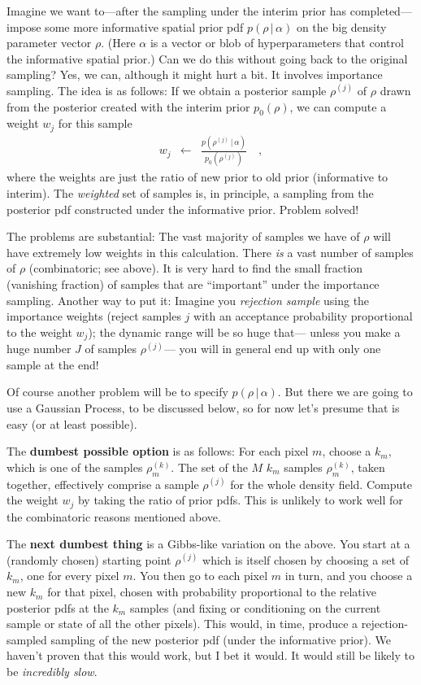 \documentclass[12pt, letterpaper]{article}
\newcommand{\given}{\,|\,}
\begin{document}
Imagine we want to---after the sampling under the interim prior has completed---%
  impose some more informative spatial prior pdf $p(\rho\given\alpha)$
  on the big density parameter vector $\rho$.
(Here $\alpha$ is a vector or blob of hyperparameters that control the informative spatial prior.)
Can we do this without going back to the original sampling?
Yes, we can, although it might hurt a bit.
It involves importance sampling.
The idea is as follows:
If we obtain a posterior sample $\rho^{(j)}$ of $\rho$ drawn from the posterior
  created with the interim prior $p_0(\rho)$,
  we can compute a weight $w_j$ for this sample
\begin{eqnarray}
w_j & \leftarrow & \frac{p(\rho^{(j)}\given\alpha)}{p_0(\rho^{(j)})}
\quad,
\end{eqnarray}
  where the weights are just the ratio of new prior to old prior (informative to interim).
The \emph{weighted} set of samples is, in principle,
  a sampling from the posterior pdf constructed under the informative prior.
Problem solved!

The problems are substantial:
The vast majority of samples we have of $\rho$ will have extremely low weights in this calculation.
There \emph{is} a vast number of samples of $\rho$ (combinatoric; see above).
It is very hard to find the small fraction (vanishing fraction) of samples that are ``important''
  under the importance sampling.
Another way to put it:
Imagine you \emph{rejection sample} using the importance weights
  (reject samples $j$ with an acceptance probability proportional to the weight $w_j$);
  the dynamic range will be so huge that---%
  unless you make a huge number $J$ of samples $\rho^{(j)}$---%
  you will in general end up with only one sample at the end!

Of course another problem will be to specify $p(\rho\given\alpha)$.
But there we are going to use a Gaussian Process,
  to be discussed below,
  so for now let's presume that is easy (or at least possible).

The \textbf{dumbest possible option} is as follows:
For each pixel $m$, choose a $k_m$, which is one of the samples $\rho_m^{(k)}$.
The set of the $M$ $k_m$ samples $\rho_m^{(k)}$, taken together,
  effectively comprise a sample $\rho^{(j)}$ for the whole density field.
Compute the weight $w_j$ by taking the ratio of prior pdfs.
This is unlikely to work well for the combinatoric reasons mentioned above.

The \textbf{next dumbest thing} is a Gibbs-like variation on the above.
You start at a (randomly chosen) starting point $\rho^{(j)}$ which is itself
  chosen by choosing a set of $k_m$, one for every pixel $m$.
You then go to each pixel $m$ in turn, and you choose a new $k_m$ for that pixel,
  chosen with probability proportional to the relative posterior pdfs at the $k_m$ samples
  (and fixing or conditioning on the current sample or state of all the other pixels).
This would, in time, produce a rejection-sampled sampling of the new posterior pdf
  (under the informative prior).
We haven't proven that this would work, but I bet it would.
It would still be likely to be \emph{incredibly slow}.
\end{document}
